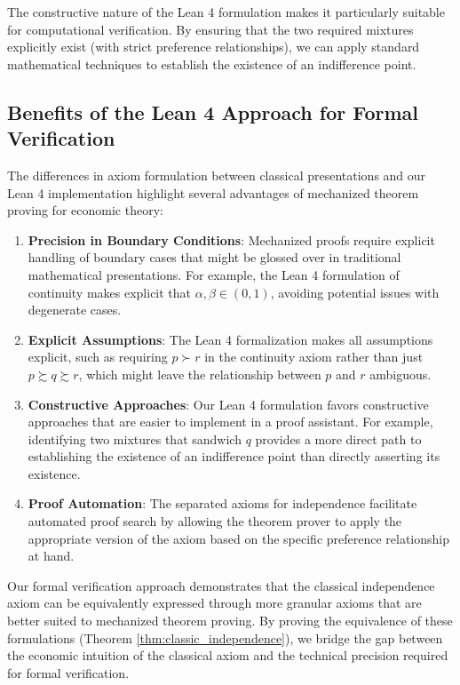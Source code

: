 \documentclass{article}
\theoremstyle{definition}
\newcommand{\pref}{\succsim} %
\newcommand{\strictpref}{\succ} %
\begin{document}
The constructive nature of the Lean 4 formulation makes it particularly suitable for computational verification. By ensuring that the two required mixtures explicitly exist (with strict preference relationships), we can apply standard mathematical techniques to establish the existence of an indifference point.

\subsection{Benefits of the Lean 4 Approach for Formal Verification}

The differences in axiom formulation between classical presentations and our Lean 4 implementation highlight several advantages of mechanized theorem proving for economic theory:

\begin{enumerate}
    \item \textbf{Precision in Boundary Conditions}: Mechanized proofs require explicit handling of boundary cases that might be glossed over in traditional mathematical presentations. For example, the Lean 4 formulation of continuity makes explicit that $\alpha, \beta \in (0,1)$, avoiding potential issues with degenerate cases.

    \item \textbf{Explicit Assumptions}: The Lean 4 formalization makes all assumptions explicit, such as requiring $p \strictpref r$ in the continuity axiom rather than just $p \pref q \pref r$, which might leave the relationship between $p$ and $r$ ambiguous.

    \item \textbf{Constructive Approaches}: Our Lean 4 formulation favors constructive approaches that are easier to implement in a proof assistant. For example, identifying two mixtures that sandwich $q$ provides a more direct path to establishing the existence of an indifference point than directly asserting its existence.

    \item \textbf{Proof Automation}: The separated axioms for independence facilitate automated proof search by allowing the theorem prover to apply the appropriate version of the axiom based on the specific preference relationship at hand.
\end{enumerate}

Our formal verification approach demonstrates that the classical independence axiom can be equivalently expressed through more granular axioms that are better suited to mechanized theorem proving. By proving the equivalence of these formulations (Theorem \ref{thm:classic_independence}), we bridge the gap between the economic intuition of the classical axiom and the technical precision required for formal verification.
\end{document}
